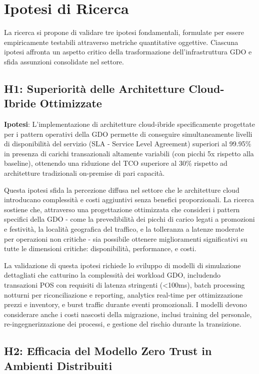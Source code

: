 \section{Ipotesi di Ricerca}

La ricerca si propone di validare tre ipotesi fondamentali, formulate per essere empiricamente testabili attraverso metriche quantitative oggettive. Ciascuna ipotesi affronta un aspetto critico della trasformazione dell'infrastruttura GDO e sfida assunzioni consolidate nel settore.

\subsection{H1: Superiorità delle Architetture Cloud-Ibride Ottimizzate}

\textbf{Ipotesi}: L'implementazione di architetture cloud-ibride specificamente progettate per i pattern operativi della GDO permette di conseguire simultaneamente livelli di disponibilità del servizio (SLA - Service Level Agreement) superiori al 99.95\% in presenza di carichi transazionali altamente variabili (con picchi 5x rispetto alla baseline), ottenendo una riduzione del TCO superiore al 30\% rispetto ad architetture tradizionali on-premise di pari capacità.

Questa ipotesi sfida la percezione diffusa nel settore che le architetture cloud introducano complessità e costi aggiuntivi senza benefici proporzionali. La ricerca sostiene che, attraverso una progettazione ottimizzata che consideri i pattern specifici della GDO - come la prevedibilità dei picchi di carico legati a promozioni e festività, la località geografica del traffico, e la tolleranza a latenze moderate per operazioni non critiche - sia possibile ottenere miglioramenti significativi su tutte le dimensioni critiche: disponibilità, performance, e costi.

La validazione di questa ipotesi richiede lo sviluppo di modelli di simulazione dettagliati che catturino la complessità dei workload GDO, includendo transazioni POS con requisiti di latenza stringenti (<100ms), batch processing notturni per riconciliazione e reporting, analytics real-time per ottimizzazione prezzi e inventory, e burst traffic durante eventi promozionali. I modelli devono considerare anche i costi nascosti della migrazione, inclusi training del personale, re-ingegnerizzazione dei processi, e gestione del rischio durante la transizione.

\subsection{H2: Efficacia del Modello Zero Trust in Ambienti Distribuiti}


